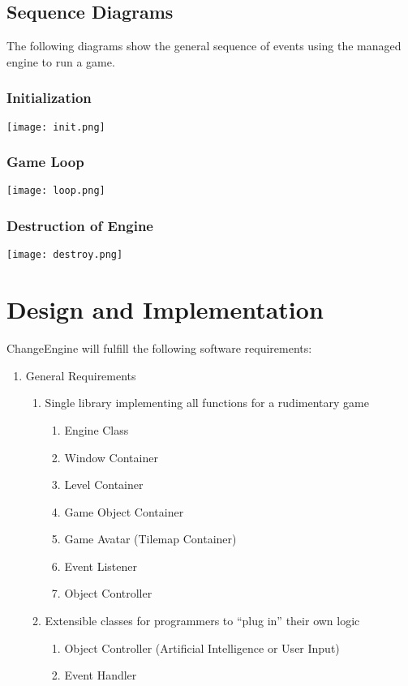 \documentclass[12pt]{article}
\begin{document}
\subsection{Sequence Diagrams}
The following diagrams show the general sequence of events using the managed engine to run a game.

\subsubsection{Initialization}
\texttt{[image: init.png]}

\subsubsection{Game Loop}
\texttt{[image: loop.png]}

\subsubsection{Destruction of Engine}
\texttt{[image: destroy.png]}

  \section{Design and Implementation}
    ChangeEngine will fulfill the following software requirements:

\begin{enumerate}
  \item General Requirements

  \begin{enumerate}
    \item Single library implementing all functions for a rudimentary game

    \begin{enumerate}
      \item Engine Class
      \item Window Container
      \item Level Container
      \item Game Object Container
      \item Game Avatar (Tilemap Container)
      \item Event Listener
      \item Object Controller
    \end{enumerate}

    \item Extensible classes for programmers to ``plug in'' their own logic

    \begin{enumerate}
      \item Object Controller (Artificial Intelligence or User Input)
      \item Event Handler
    \end{enumerate}

  \end{enumerate}

\end{enumerate}
\end{document}
